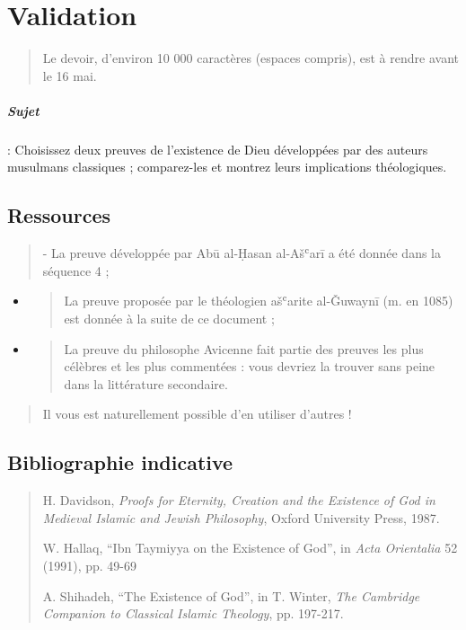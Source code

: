 \chapter{Validation}


\begin{quote}
Le devoir, d'environ 10 000 caractères (espaces compris), est à rendre
avant le 16 mai.
\end{quote}
\paragraph{Sujet} : Choisissez deux preuves de l’existence de Dieu développées par des auteurs
musulmans classiques ; comparez-les et montrez leurs implications théologiques.

\hypertarget{ressources}{%
\section{Ressources}\label{ressources}}

\begin{quote}
- La preuve développée par Abū al-Ḥasan al-Ašʿarī a été donnée dans la
séquence 4 ;
\end{quote}

\begin{itemize}
\item
  \begin{quote}
  La preuve proposée par le théologien ašʿarite al-Ǧuwaynī (m. en 1085)
  est donnée à la suite de ce document ;
  \end{quote}
\item
  \begin{quote}
  La preuve du philosophe Avicenne fait partie des preuves les plus
  célèbres et les plus commentées : vous devriez la trouver sans peine
  dans la littérature secondaire.
  \end{quote}
\end{itemize}

\begin{quote}
Il vous est naturellement possible d'en utiliser d'autres !
\end{quote}

\hypertarget{bibliographie-indicative}{%
\section{Bibliographie indicative}\label{bibliographie-indicative}}

\begin{quote}
H. Davidson, \emph{Proofs for Eternity, Creation and the Existence of
God in Medieval Islamic and Jewish Philosophy}, Oxford University Press,
1987.

W. Hallaq, ``Ibn Taymiyya on the Existence of God'', in \emph{Acta
Orientalia} 52 (1991), pp. 49-69

A. Shihadeh, ``The Existence of God'', in T. Winter, \emph{The Cambridge
Companion to Classical Islamic Theology}, pp. 197-217.
\end{quote}

